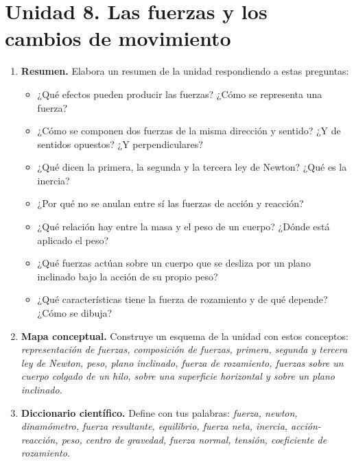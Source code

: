 \section{Unidad 8. Las fuerzas y los cambios de movimiento}

\begin{enumerate}[label=\numberballred]
    \item \textbf{Resumen.} Elabora un resumen de la unidad respondiendo a estas preguntas:
    \begin{itemize}
        \item ¿Qué efectos pueden producir las fuerzas? ¿Cómo se representa una fuerza?
        \item ¿Cómo se componen dos fuerzas de la misma dirección y sentido? ¿Y de sentidos opuestos? ¿Y perpendiculares?
        \item ¿Qué dicen la primera, la segunda y la tercera ley de Newton? ¿Qué es la inercia?
        \item ¿Por qué no se anulan entre sí las fuerzas de acción y reacción?
        \item ¿Qué relación hay entre la masa y el peso de un cuerpo? ¿Dónde está aplicado el peso?
        \item ¿Qué fuerzas actúan sobre un cuerpo que se desliza por un plano inclinado bajo la acción de su propio peso?
        \item ¿Qué características tiene la fuerza de rozamiento y de qué depende? ¿Cómo se dibuja?
    \end{itemize}
    \item \textbf{Mapa conceptual.} Construye un esquema de la unidad con estos conceptos: \emph{representación de fuerzas, composición de fuerzas, primera, segunda y tercera ley de Newton, peso, plano inclinado, fuerza de rozamiento, fuerzas sobre un cuerpo colgado de un hilo, sobre una superficie horizontal y sobre un plano inclinado}.
    \item \textbf{Diccionario científico.} Define con tus palabras: \emph{fuerza, newton, dinamómetro, fuerza resultante, equilibrio, fuerza neta, inercia, acción-reacción, peso, centro de gravedad, fuerza normal, tensión, coeficiente de rozamiento}.
\end{enumerate}


